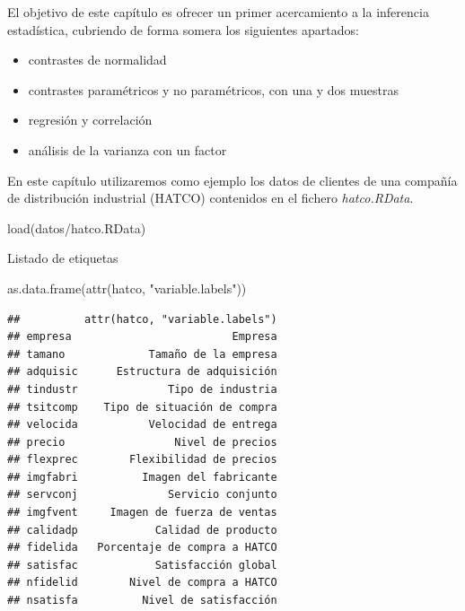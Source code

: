 \documentclass[
]{book}
\newenvironment{Shaded}{\begin{snugshade}}{\end{snugshade}}
\newcommand{\FunctionTok}[1]{\textcolor[rgb]{0.00,0.00,0.00}{#1}}
\newcommand{\NormalTok}[1]{#1}
\newcommand{\StringTok}[1]{\textcolor[rgb]{0.31,0.60,0.02}{#1}}
\providecommand{\tightlist}{%
  \setlength{\itemsep}{0pt}\setlength{\parskip}{0pt}}
\theoremstyle{break}
\begin{document}
El objetivo de este capítulo es ofrecer un primer acercamiento a la inferencia estadística,
cubriendo de forma somera los siguientes apartados:

\begin{itemize}
\tightlist
\item
  contrastes de normalidad
\item
  contrastes paramétricos y no paramétricos, con una y dos muestras
\item
  regresión y correlación
\item
  análisis de la varianza con un factor
\end{itemize}

En este capítulo utilizaremos como ejemplo los datos de clientes de una compañía de distribución industrial (HATCO)
contenidos en el fichero \emph{hatco.RData}.

\begin{Shaded}
\begin{Highlighting}[]
\FunctionTok{load}\NormalTok{(}\StringTok{\textquotesingle{}datos/hatco.RData\textquotesingle{}}\NormalTok{)}
\end{Highlighting}
\end{Shaded}

Listado de etiquetas

\begin{Shaded}
\begin{Highlighting}[]
\FunctionTok{as.data.frame}\NormalTok{(}\FunctionTok{attr}\NormalTok{(hatco, }\StringTok{"variable.labels"}\NormalTok{))}
\end{Highlighting}
\end{Shaded}

\begin{verbatim}
##          attr(hatco, "variable.labels")
## empresa                         Empresa
## tamano             Tamaño de la empresa
## adquisic      Estructura de adquisición
## tindustr              Tipo de industria
## tsitcomp    Tipo de situación de compra
## velocida           Velocidad de entrega
## precio                 Nivel de precios
## flexprec        Flexibilidad de precios
## imgfabri          Imagen del fabricante
## servconj              Servicio conjunto
## imgfvent     Imagen de fuerza de ventas
## calidadp            Calidad de producto
## fidelida   Porcentaje de compra a HATCO
## satisfac            Satisfacción global
## nfidelid        Nivel de compra a HATCO
## nsatisfa          Nivel de satisfacción
\end{verbatim}
\end{document}
